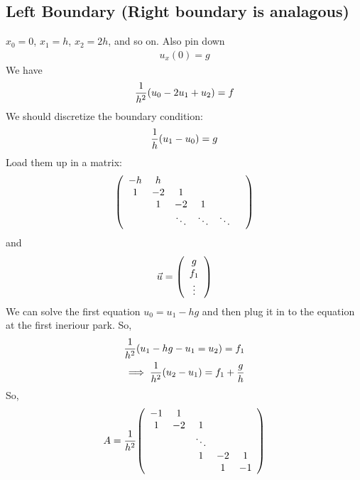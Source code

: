 \documentclass{article}
\begin{document}
        \subsection{Left Boundary (Right boundary is analagous)}
            $x_0 = 0$, $x_1 = h$, $x_2 = 2h$, and so on.  Also pin down
            \begin{align}
                u_x(0) = g
            \end{align}
            We have
            \begin{align}
                \frac{1}{h^2}\qty(u_0 - 2u_1 + u_2) = f
            \end{align}
            We should discretize the boundary condition:
            \begin{align}
                \frac{1}{h}\qty(u_1 - u_0) = g
            \end{align}
            Load them up in a matrix:
            \begin{align}
                \qty(\begin{array}{cccccc}
                    -h & h & & & \\
                    1 & -2 & 1 & & \\
                    & 1 & -2 & 1 && \\
                    & & \ddots & \ddots & \ddots \\
                \end{array})
            \end{align}
            and
            \begin{align}
                \vec{u} = \qty(\begin{array}{c} g \\ f_1 \\ \vdots \end{array})
            \end{align}
            We can solve the first equation $u_0 = u_1 - hg$ and then plug it in to the equation at the first ineriour park.  So,
            \begin{align}
                \frac{1}{h^2}\qty(u_1 - hg - u_1 = u_2) = f_1 \\
                \implies \frac{1}{h^2}\qty(u_2 - u_1) = f_1 + \frac{g}{h}
            \end{align}
            So,
            \begin{align}
            A = \frac{1}{h^2}\qty(\begin{array}{ccccc}
                -1 & 1 & & & \\
                1 & -2 & 1 & \\
                & & \ddots & & \\
                & & 1 & -2 & 1 \\
                & & & 1 & -1
            \end{array})
            \end{align}
\end{document}
